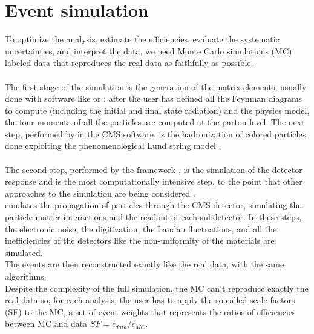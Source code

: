 \section{Event simulation}
To optimize the analysis, estimate the efficiencies, evaluate the systematic uncertainties, and interpret the data, we need Monte Carlo simulations (MC): labeled data that reproduces the real data as faithfully as possible.\\
\\
The first stage of the simulation is the generation of the matrix elements, usually done with software like \MADGRAPH \cite{Alwall2011MadGraphBeyond} or \POWHEG \cite{Alioli2010ABOX}: after the user has defined all the Feynman diagrams to compute (including the initial and final state radiation) and the physics model, the four momenta of all the particles are computed at the parton level.
The next step, performed by \PYTHIA \cite{Sjostrand2006PYTHIAManual} in the CMS software, is the hadronization of colored particles, done exploiting the phenomenological Lund string model \cite{Andersson1983PartonDynamics}.\\
\\
The second step, performed by the \GEANTfour framework \cite{Agostinelli2003GEANT4--aToolkit}, is the simulation of the detector response and is the most computationally intensive step, to the point that other approaches to the simulation are being considered \cite{Sekmen2016RecentSimulation,Vaselli2023FlashSimFlow}.\\
\GEANT emulates the propagation of particles through the CMS detector, simulating the particle-matter interactions and the readout of each subdetector. In these steps, the electronic noise, the digitization, the Landau fluctuations, and all the inefficiencies of the detectors like the non-uniformity of the materials are simulated.\\
The events are then reconstructed exactly like the real data, with the same algorithms.\\
Despite the complexity of the full simulation, the MC can't reproduce exactly the real data so, for each analysis, the user has to apply the so-called scale factors (SF) to the MC, a set of event weights that represents the ratios of efficiencies between MC and data $SF=\epsilon_{data}/\epsilon_{MC}$.

